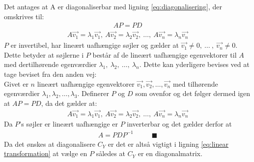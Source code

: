 Det antages at A er diagonaliserbar med ligning \ref{eq:diagonalisering}, der omskrives til:
\begin{align*} AP = PD \end{align*}
\begin{align*} A\vec{v_1} = \lambda_1\vec{v_1},\ A\vec{v_2} = \lambda_2\vec{v_2},\ …,\ A\vec{v_n} = \lambda_n\vec{v_n} \end{align*}
$P$ er invertibel, har lineært uafhængige søjler og gælder at $ \vec{v_1} \neq 0,\ …\ ,\ \vec{v_n} \neq 0 $. Dette betyder at søjlerne i $P$ består af de lineært uafhængige egenvektorer til $A$ med dertilhørende egenværdier $\lambda_1,\ \lambda_2,\ …,\ \lambda_n$. Dette kan yderligere bevises ved at tage beviset fra den anden vej:\\
Givet er $n$ lineært uafhængige egenvektorer $\vec{v_1}, \vec{v_2}, \hdots, \vec{v_n}$ med tilhørende egenværdier $\lambda_1, \lambda_2, …, \lambda_3$. Definerer $P$ og $D$ som ovenfor og det følger dermed igen at $AP = PD$, da det gælder at:
\begin{align*} A\vec{v_1} = \lambda_1\vec{v_1},\ A\vec{v_2} = \lambda_2\vec{v_2},\ …,\ A\vec{v_n} = \lambda_n\vec{v_n} \end{align*}
Da $P$'s søjler er lineært uafhængige er $P$ inverterbar og det gælder derfor at
\begin{align*} A = PDP^{-1} \phantom{mmm} \blacksquare \end{align*}
Da det ønskes at diagonalisere $C_Y$ er det er altså vigtigt i ligning \vref{eq:linear transformation} at vælge en $P$ således at $C_Y$ er en diagonalmatrix.

%

